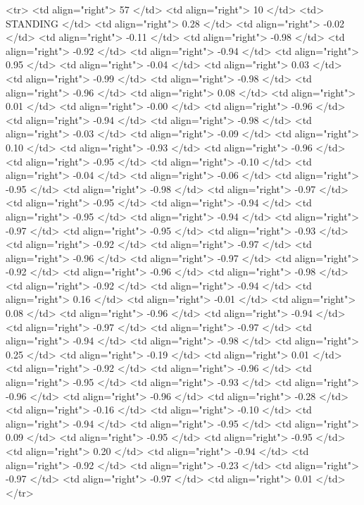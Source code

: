   <tr> <td align="right"> 57 </td> <td align="right">  10 </td> <td> STANDING </td> <td align="right"> 0.28 </td> <td align="right"> -0.02 </td> <td align="right"> -0.11 </td> <td align="right"> -0.98 </td> <td align="right"> -0.92 </td> <td align="right"> -0.94 </td> <td align="right"> 0.95 </td> <td align="right"> -0.04 </td> <td align="right"> 0.03 </td> <td align="right"> -0.99 </td> <td align="right"> -0.98 </td> <td align="right"> -0.96 </td> <td align="right"> 0.08 </td> <td align="right"> 0.01 </td> <td align="right"> -0.00 </td> <td align="right"> -0.96 </td> <td align="right"> -0.94 </td> <td align="right"> -0.98 </td> <td align="right"> -0.03 </td> <td align="right"> -0.09 </td> <td align="right"> 0.10 </td> <td align="right"> -0.93 </td> <td align="right"> -0.96 </td> <td align="right"> -0.95 </td> <td align="right"> -0.10 </td> <td align="right"> -0.04 </td> <td align="right"> -0.06 </td> <td align="right"> -0.95 </td> <td align="right"> -0.98 </td> <td align="right"> -0.97 </td> <td align="right"> -0.95 </td> <td align="right"> -0.94 </td> <td align="right"> -0.95 </td> <td align="right"> -0.94 </td> <td align="right"> -0.97 </td> <td align="right"> -0.95 </td> <td align="right"> -0.93 </td> <td align="right"> -0.92 </td> <td align="right"> -0.97 </td> <td align="right"> -0.96 </td> <td align="right"> -0.97 </td> <td align="right"> -0.92 </td> <td align="right"> -0.96 </td> <td align="right"> -0.98 </td> <td align="right"> -0.92 </td> <td align="right"> -0.94 </td> <td align="right"> 0.16 </td> <td align="right"> -0.01 </td> <td align="right"> 0.08 </td> <td align="right"> -0.96 </td> <td align="right"> -0.94 </td> <td align="right"> -0.97 </td> <td align="right"> -0.97 </td> <td align="right"> -0.94 </td> <td align="right"> -0.98 </td> <td align="right"> 0.25 </td> <td align="right"> -0.19 </td> <td align="right"> 0.01 </td> <td align="right"> -0.92 </td> <td align="right"> -0.96 </td> <td align="right"> -0.95 </td> <td align="right"> -0.93 </td> <td align="right"> -0.96 </td> <td align="right"> -0.96 </td> <td align="right"> -0.28 </td> <td align="right"> -0.16 </td> <td align="right"> -0.10 </td> <td align="right"> -0.94 </td> <td align="right"> -0.95 </td> <td align="right"> 0.09 </td> <td align="right"> -0.95 </td> <td align="right"> -0.95 </td> <td align="right"> 0.20 </td> <td align="right"> -0.94 </td> <td align="right"> -0.92 </td> <td align="right"> -0.23 </td> <td align="right"> -0.97 </td> <td align="right"> -0.97 </td> <td align="right"> 0.01 </td> </tr>
